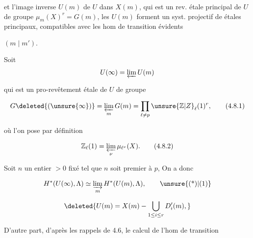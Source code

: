 
et l'image inverse $U(m)$ de $U$ dans $X(m)$, qui est un rev. étale  principal de $U$ de groupe $\mu_m(X)^r=G(m)$, les $U(m)$ forment un syst. projectif de   étales  principaux, compatibles avec les hom de transition évidents

 $(m\mid m')$.

Soit 
\[
U(\infty)=\varprojlim U(m)
\]

qui est un  pro-revêtement étale de $U$ de groupe

\[
G\deleted{(\unsure{\infty})}=\varprojlim_m G(m)=\prod_{\ell\ne p}\unsure{\mathbb{Z}|Z}_\ell(1)^r,
\tag*{(4.8.1)}
\]

 où l'on pose par définition

\[
\mathbb{Z}_\ell(1)=\varprojlim_\nu\mu_{\ell^\nu}(X).
\tag*{(4.8.2)}
\]

Soit $n$ un entier $>0$ fixé tel que $n$ soit premier à $p$,  On a donc

\[
H^*(U(\infty),\Lambda)\simeq\varinjlim_m H^*(U(m),\Lambda),
\tag*{\unsure{(*)|(1)}}
\]

\[
\deleted{U(m)=X(m)-\bigcup_{1\leq i\leq r}D'_i(m),}
\]

D'autre part, d'après les rappels de 4.6, le calcul de l'hom de transition
